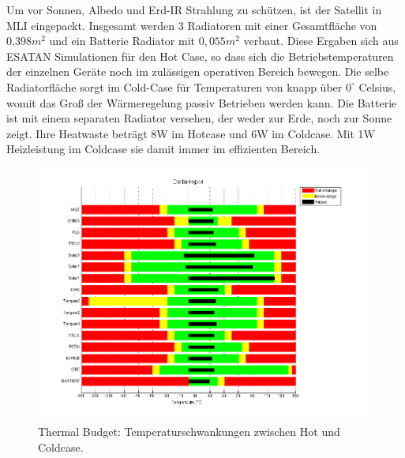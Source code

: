 \documentclass[twoside]{article}
\begin{document}
\begin{multicols}{2}
         Um vor Sonnen, Albedo und Erd-IR Strahlung zu schützen, ist der Satellit in MLI eingepackt. Insgesamt 
         werden 3 Radiatoren mit einer Gesamtfläche von $0.398m^2$ und ein Batterie Radiator mit $0,055m^2$ verbaut.
         Diese Ergaben sich aus ESATAN Simulationen für den Hot Case, so dass sich die Betriebstemperaturen
         der einzelnen Geräte noch im zulässigen operativen Bereich bewegen. Die selbe Radiatorfläche sorgt
         im Cold-Case für Temperaturen von knapp über $0^{\circ}$ Celsius, womit das Groß der Wärmeregelung passiv 
         Betrieben werden kann. Die Batterie ist mit einem separaten Radiator versehen, der weder zur Erde,
         noch zur Sonne zeigt. Ihre Heatwaste beträgt 8W im Hotcase und 6W im Coldcase.
         Mit 1W Heizleistung im Coldcase sie damit immer im effizienten Bereich.
         \begin{figure}[H]
            \captionsetup{format=plain}
            \centering
            \includegraphics[width=\linewidth]{ThermalBudget.png}       
            \caption{Thermal Budget: Temperaturschwankungen zwischen Hot und Coldcase.}
            \label{fig:thermalbudget}
         \end{figure}


\end{multicols}
\end{document}
